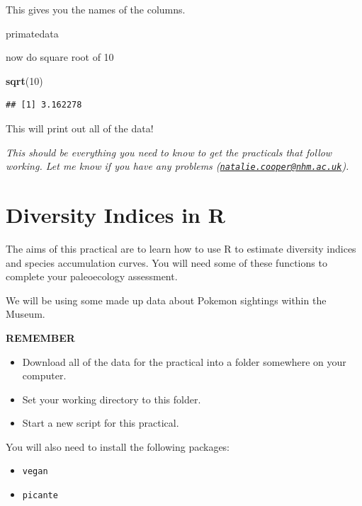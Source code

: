 \documentclass[]{book}
\newenvironment{Shaded}{\begin{snugshade}}{\end{snugshade}}
\newcommand{\KeywordTok}[1]{\textcolor[rgb]{0.13,0.29,0.53}{\textbf{{#1}}}}
\newcommand{\DecValTok}[1]{\textcolor[rgb]{0.00,0.00,0.81}{{#1}}}
\newcommand{\NormalTok}[1]{{#1}}
\providecommand{\tightlist}{%
  \setlength{\itemsep}{0pt}\setlength{\parskip}{0pt}}
\theoremstyle{definition}
\theoremstyle{definition}
\theoremstyle{definition}
\theoremstyle{remark}
\begin{document}
This gives you the names of the columns.

\begin{Shaded}
\begin{Highlighting}[]
\NormalTok{primatedata}
\end{Highlighting}
\end{Shaded}

now do square root of 10

\begin{Shaded}
\begin{Highlighting}[]
\KeywordTok{sqrt}\NormalTok{(}\DecValTok{10}\NormalTok{)}
\end{Highlighting}
\end{Shaded}

\begin{verbatim}
## [1] 3.162278
\end{verbatim}

This will print out all of the data!

\emph{This should be everything you need to know to get the practicals
that follow working. Let me know if you have any problems
(\href{mailto:natalie.cooper@nhm.ac.uk}{\nolinkurl{natalie.cooper@nhm.ac.uk}}).}

\chapter{Diversity Indices in R}\label{diversity-indices-in-r}

The aims of this practical are to learn how to use R to estimate
diversity indices and species accumulation curves. You will need some of
these functions to complete your paleoecology assessment.

We will be using some made up data about Pokemon sightings within the
Museum.

\textbf{REMEMBER}

\begin{itemize}
\tightlist
\item
  Download all of the data for the practical into a folder somewhere on
  your computer.
\item
  Set your working directory to this folder.
\item
  Start a new script for this practical.
\end{itemize}

You will also need to install the following packages:

\begin{itemize}
\tightlist
\item
  \texttt{vegan}
\item
  \texttt{picante}
\end{itemize}
\end{document}
